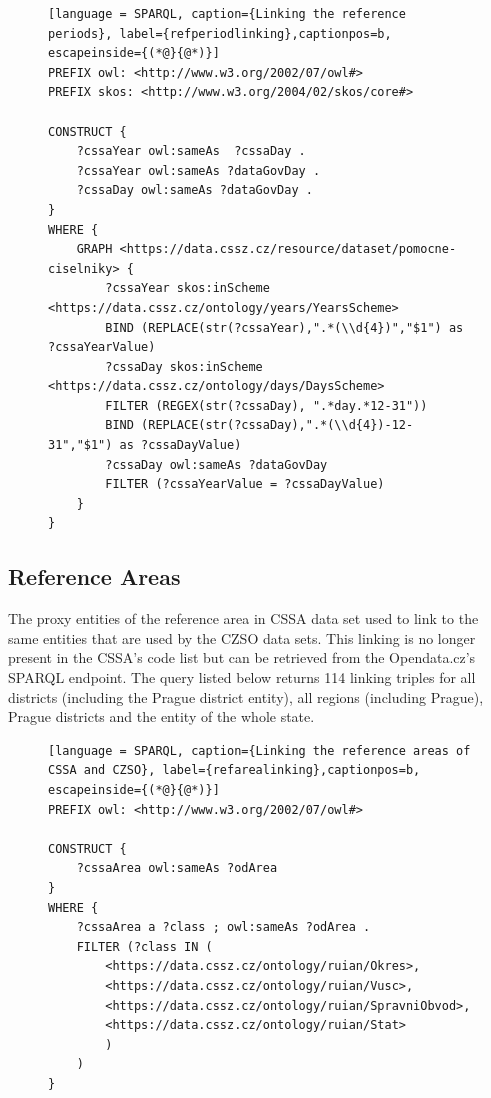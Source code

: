 \begin{figure}[h]
\begin{lstlisting}[language = SPARQL, caption={Linking the reference periods}, label={refperiodlinking},captionpos=b, escapeinside={(*@}{@*)}]
PREFIX owl: <http://www.w3.org/2002/07/owl#>
PREFIX skos: <http://www.w3.org/2004/02/skos/core#>
    
CONSTRUCT {
    ?cssaYear owl:sameAs  ?cssaDay .
    ?cssaYear owl:sameAs ?dataGovDay .
    ?cssaDay owl:sameAs ?dataGovDay .
}  
WHERE {
    GRAPH <https://data.cssz.cz/resource/dataset/pomocne-ciselniky> {
        ?cssaYear skos:inScheme <https://data.cssz.cz/ontology/years/YearsScheme>
        BIND (REPLACE(str(?cssaYear),".*(\\d{4})","$1") as ?cssaYearValue)
        ?cssaDay skos:inScheme <https://data.cssz.cz/ontology/days/DaysScheme>
        FILTER (REGEX(str(?cssaDay), ".*day.*12-31"))
        BIND (REPLACE(str(?cssaDay),".*(\\d{4})-12-31","$1") as ?cssaDayValue)
        ?cssaDay owl:sameAs ?dataGovDay
        FILTER (?cssaYearValue = ?cssaDayValue)
    }
}
\end{lstlisting}
\end{figure}

\subsection{Reference Areas}

The proxy entities of the reference area in CSSA data set used to link to the same entities that are used by the CZSO data sets. This linking is no longer present in the CSSA's code list but can be retrieved from the Opendata.cz's SPARQL endpoint. The query listed below returns 114 linking triples for all districts (including the Prague district entity), all regions (including Prague), Prague districts and the entity of the whole state.

\begin{figure}[h]
\begin{lstlisting}[language = SPARQL, caption={Linking the reference areas of CSSA and CZSO}, label={refarealinking},captionpos=b, escapeinside={(*@}{@*)}]
PREFIX owl: <http://www.w3.org/2002/07/owl#>

CONSTRUCT {
    ?cssaArea owl:sameAs ?odArea
}
WHERE {
    ?cssaArea a ?class ; owl:sameAs ?odArea .
    FILTER (?class IN (
        <https://data.cssz.cz/ontology/ruian/Okres>,
        <https://data.cssz.cz/ontology/ruian/Vusc>,
        <https://data.cssz.cz/ontology/ruian/SpravniObvod>,
        <https://data.cssz.cz/ontology/ruian/Stat>
        )
    )
}
\end{lstlisting}
\end{figure}

